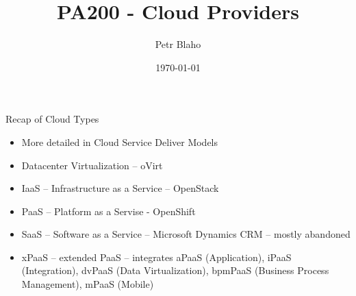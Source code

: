 \documentclass[presentation]{beamer}
\author{Petr Blaho}
\date{\today}
\title{PA200 - Cloud Providers}
\begin{document}
\maketitle

\begin{frame}[label={sec:org657d1a9}]{Recap of Cloud Types}
\begin{itemize}
\item More detailed in Cloud Service Deliver Models
\item Datacenter Virtualization -- oVirt
\item IaaS -- Infrastructure as a Service -- OpenStack
\item PaaS -- Platform as a Servise - OpenShift
\item SaaS -- Software as a Service -- Microsoft Dynamics CRM -- mostly
abandoned
\item xPaaS -- extended PaaS -- integrates aPaaS (Application), iPaaS
(Integration), dvPaaS (Data Virtualization), bpmPaaS (Business
Process Management), mPaaS (Mobile)
\end{itemize}
\end{frame}
\end{document}
